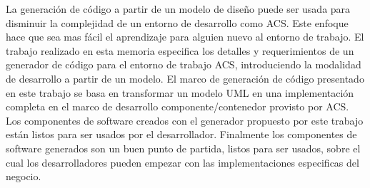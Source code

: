 %
La generación de código a partir de un modelo de diseño puede ser usada para disminuir la complejidad de un entorno de desarrollo como ACS.
Este enfoque hace que sea mas fácil el aprendizaje para alguien nuevo al entorno de trabajo.
El trabajo realizado en esta memoria especifica los detalles y requerimientos de
un generador de código para el entorno de trabajo ACS,
introduciendo la modalidad de desarrollo a partir de un modelo.
El marco de generación de código presentado en este trabajo
se basa en transformar un modelo UML en una implementación
completa en el marco de desarrollo componente/contenedor provisto por ACS.
Los componentes de software creados con
el generador propuesto por este trabajo
están listos para ser usados por el desarrollador.
Finalmente los componentes de software generados
son un buen punto de partida,
listos para ser usados,
sobre el cual los desarrolladores
pueden empezar con las implementaciones especificas
del negocio.


